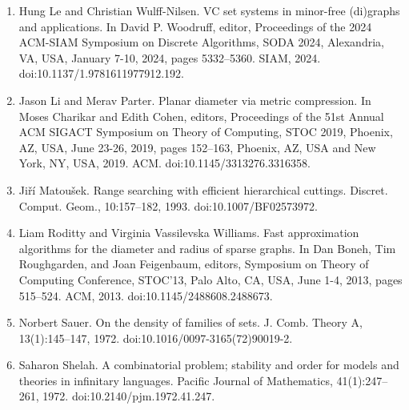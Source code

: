 \begin{enumerate}
\item[]  [16]  Hung Le and Christian Wulff-Nilsen.  VC set systems in minor-free (di)graphs and applications.  In David P. Woodruff, editor, Proceedings of the 2024 ACM-SIAM Symposium on Discrete Algorithms, SODA 2024, Alexandria, VA, USA, January 7-10, 2024, pages 5332–5360. SIAM, 2024.  doi:10.1137/1.9781611977912.192.  
\item[]  [17]  Jason Li and Merav Parter.  Planar diameter via metric compression.  In Moses Charikar and Edith Cohen, editors, Proceedings of the 51st Annual ACM SIGACT Symposium on Theory of Computing, STOC 2019, Phoenix, AZ, USA, June 23-26, 2019, pages 152–163, Phoenix, AZ, USA and New York, NY, USA, 2019. ACM.  doi:10.1145/3313276.3316358.  
\item[]  [18]  Jiří Matoušek.  Range searching with efficient hierarchical cuttings.  Discret. Comput. Geom., 10:157–182, 1993.  doi:10.1007/BF02573972.  
\item[]  [19]  Liam Roditty and Virginia Vassilevska Williams.  Fast approximation algorithms for the diameter and radius of sparse graphs.  In Dan Boneh, Tim Roughgarden, and Joan Feigenbaum, editors, Symposium on Theory of Computing Conference, STOC’13, Palo Alto, CA, USA, June 1-4, 2013, pages 515–524. ACM, 2013.  doi:10.1145/2488608.2488673.  
\item[]  [20]  Norbert Sauer.  On the density of families of sets.  J. Comb. Theory A, 13(1):145–147, 1972.  doi:10.1016/0097-3165(72)90019-2.  
\item[]  [21]  Saharon Shelah.  A combinatorial problem; stability and order for models and theories in infinitary languages.  Pacific Journal of Mathematics, 41(1):247–261, 1972.  doi:10.2140/pjm.1972.41.247.  
\end{enumerate}
